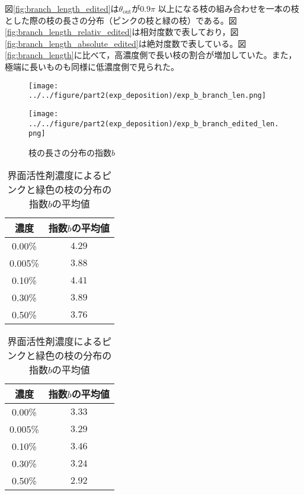\documentclass[autodetect-engine,dvi=dvipdfmx,a4paper,ja=standard,oneside,openany,11pt,draft]{bxjsbook}
\begin{document}
図\ref{fig:branch_length_edited}は$\theta_{\mathrm{out}}$が$0.9\pi$ 以上になる枝の組み合わせを一本の枝とした際の枝の長さの分布（ピンクの枝と緑の枝）である。図\ref{fig:branch_length_relativ_edited}は相対度数で表しており，図\ref{fig:branch_length_absolute_edited}は絶対度数で表している。図\ref{fig:branch_length}に比べて，高濃度側で長い枝の割合が増加していた。また，極端に長いものも同様に低濃度側で見られた。
\begin{figure}[H]
  \begin{minipage}
    {0.32\textwidth}
    \centering
    \texttt{[image: ../../figure/part2(exp\_deposition)/exp\_b\_branch\_len.png]}
    \label{fig:exp_b_branch_len}
  \end{minipage}
  \begin{minipage}
    {0.32\textwidth}
    \centering
    \texttt{[image: ../../figure/part2(exp\_deposition)/exp\_b\_branch\_edited\_len.png]}
    \label{fig:exp_b_branch_edited_len}
  \end{minipage}
  \caption{枝の長さの分布の指数$b$}
  \label{fig:branch_length_exp}
\end{figure}
\begin{table}[H]
  \begin{minipage}{0.45\textwidth}
    \centering
    \caption{界面活性剤濃度によるピンク色の枝の分布の指数$b$の平均値}
    \begin{tabular}{|c|c|}
      \hline
      濃度      & 指数$b$の平均値 \\ \hline\hline
      0.00\%  & $4.29$    \\ \hline
      0.005\% & $3.88$    \\ \hline
      0.10\%  & $4.41$    \\ \hline
      0.30\%  & $3.89$    \\ \hline
      0.50\%  & $3.76$    \\
      \hline
    \end{tabular}
    \label{tab:brnch_len_exp}
  \end{minipage}
  \hfill
  \begin{minipage}{0.45\textwidth}
    \centering
    \caption{界面活性剤濃度によるピンクと緑色の枝の分布の指数$b$の平均値}
    \begin{tabular}{|c|c|}
      \hline
      濃度      & 指数$b$の平均値 \\ \hline\hline
      0.00\%  & $3.33$    \\ \hline
      0.005\% & $3.29$    \\ \hline
      0.10\%  & $3.46$    \\ \hline
      0.30\%  & $3.24$    \\ \hline
      0.50\%  & $2.92$    \\
      \hline
    \end{tabular}
    \label{tab:branch_len_exp_edited}
  \end{minipage}
\end{table}
\end{document}
